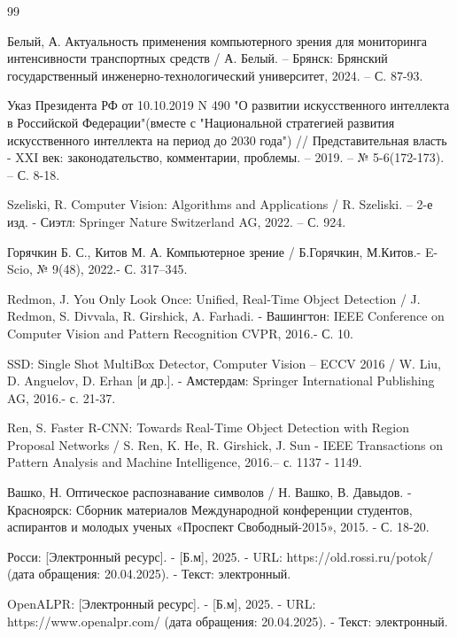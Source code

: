 \documentclass[a4paper,12pt]{article}
\begin{document}
\newpage
{}
{}
\begin{thebibliography}{99}

Белый, А. Актуальность применения компьютерного зрения для мониторинга интенсивности транспортных средств / А. Белый. – Брянск: Брянский государственный инженерно-технологический университет, 2024. – С. 87-93.

Указ Президента РФ от 10.10.2019 N 490 "О развитии искусственного интеллекта в Российской Федерации"(вместе с "Национальной стратегией развития искусственного интеллекта на период до 2030 года") // Представительная власть - XXI век: законодательство, комментарии, проблемы. – 2019. – № 5-6(172-173). – С. 8-18.

Szeliski, R. Computer Vision: Algorithms and Applications / R. Szeliski. – 2-е изд. - Сиэтл: Springer Nature Switzerland AG, 2022. – С. 924.

Горячкин Б. С., Китов М. А. Компьютерное зрение / Б.Горячкин, М.Китов.-  E-Scio, № 9(48), 2022.-  С. 317–345.

Redmon, J. You Only Look Once: Unified, Real-Time Object Detection / J. Redmon, S. Divvala, R. Girshick, A. Farhadi. - Вашингтон: IEEE Conference on Computer Vision and Pattern Recognition CVPR, 2016.- С. 10.

SSD: Single Shot MultiBox Detector, Computer Vision – ECCV 2016 / W. Liu, D. Anguelov, D. Erhan [и др.]. - Амстердам: Springer International Publishing AG, 2016.- с. 21-37. 

Ren, S. Faster R-CNN: Towards Real-Time Object Detection
with Region Proposal Networks / S. Ren, K. He, R. Girshick, J. Sun -  IEEE Transactions on Pattern Analysis and Machine Intelligence, 2016.– с. 1137 - 1149.

Вашко, Н. Оптическое распознавание символов / Н. Вашко, В. Давыдов. - Красноярск: Сборник материалов Международной конференции студентов, аспирантов и молодых ученых «Проспект Свободный-2015», 2015. - С. 18-20.

Росси: [Электронный ресурс]. - [Б.м], 2025. - URL: https://old.rossi.ru/potok/ (дата обращения: 20.04.2025). - Текст: электронный.

OpenALPR: [Электронный ресурс]. - [Б.м], 2025. - URL: https://www.openalpr.com/ (дата обращения: 20.04.2025). - Текст: электронный.


\end{thebibliography}
\end{document}
